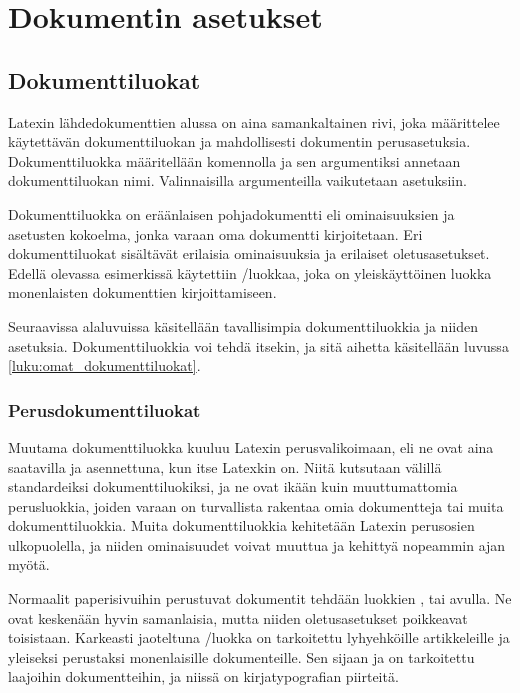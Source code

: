 \chapter{Dokumentin asetukset}


\section{Dokumenttiluokat}
\label{luku:dokumenttiluokat}

Latexin lähdedokumenttien alussa on aina samankaltainen rivi, joka
määrittelee käytettävän dokumenttiluokan ja mahdollisesti dokumentin
pe\-rus\-ase\-tuk\-sia. Dokumenttiluokka määritellään komennolla
 ja sen argumentiksi annetaan
dokumenttiluokan nimi. Valinnaisilla argumenteilla vaikutetaan
asetuksiin.


Dokumenttiluokka on eräänlaisen pohjadokumentti eli ominaisuuksien ja
asetusten kokoelma, jonka varaan oma dokumentti kirjoitetaan. Eri
dokumenttiluokat sisältävät erilaisia ominaisuuksia ja erilaiset
oletusasetukset. Edellä olevassa esimerkissä käytettiin
\-/luokkaa, joka on yleiskäyttöinen luokka
monenlaisten dokumenttien kirjoittamiseen.

Seuraavissa alaluvuissa käsitellään tavallisimpia dokumenttiluokkia ja
niiden asetuksia. Dokumenttiluokkia voi tehdä itsekin, ja sitä aihetta
käsitellään luvussa \ref{luku:omat_dokumenttiluokat}.

\subsection{Perusdokumenttiluokat}

Muutama dokumenttiluokka kuuluu Latexin perusvalikoimaan, eli ne ovat
aina saatavilla ja asennettuna, kun itse Latexkin on. Niitä kutsutaan
välillä standardeiksi dokumenttiluokiksi, ja ne ovat ikään kuin
muuttumattomia perusluokkia, joiden varaan on turvallista rakentaa omia
dokumentteja tai muita dokumenttiluokkia. Muita dokumenttiluokkia
kehitetään Latexin perusosien ulkopuolella, ja niiden ominaisuudet
voivat muuttua ja kehittyä nopeammin ajan myötä.

Normaalit%
 paperisivuihin perustuvat
dokumentit tehdään luokkien ,  tai
 avulla. Ne ovat keskenään hyvin samanlaisia, mutta
niiden oletusasetukset poikkeavat toisistaan. Karkeasti jaoteltuna
\-/luokka on tarkoitettu lyhyehköille artikkeleille ja
yleiseksi perustaksi monenlaisille dokumenteille. Sen sijaan
 ja  on tarkoitettu laajoihin
dokumentteihin, ja niissä on kirja\-typo\-grafian piirteitä.

